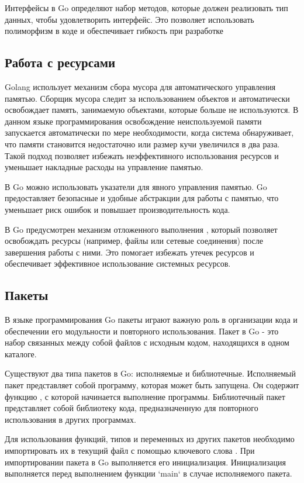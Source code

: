 Интерфейсы в Go определяют набор методов, которые должен реализовать тип данных, чтобы удовлетворить интерфейс.
Это позволяет использовать полиморфизм в коде и обеспечивает гибкость при разработке



\subsection*{Работа с ресурсами}

Golang использует механизм сбора мусора для автоматического управления памятью.
Сборщик мусора следит за использованием объектов и автоматически освобождает память, занимаемую объектами, которые больше не используются.
В данном языке программирования освобождение неиспользуемой памяти запускается автоматически по мере необходимости, когда система обнаруживает, что памяти становится недостаточно или размер кучи увеличился в два раза.
Такой подход позволяет избежать неэффективного использования ресурсов и уменьшает накладные расходы на управление памятью.

В Go можно использовать указатели для явного управления памятью.
Go предоставляет безопасные и удобные абстракции для работы с памятью, что уменьшает риск ошибок и повышает производительность кода.

В Go предусмотрен механизм отложенного выполнения , который позволяет освобождать ресурсы (например, файлы или сетевые соединения) после завершения работы с ними.
Это помогает избежать утечек ресурсов и обеспечивает эффективное использование системных ресурсов.

\subsection*{Пакеты}

В языке программирования Go пакеты играют важную роль в организации кода и обеспечении его модульности и повторного использования.
Пакет в Go - это набор связанных между собой файлов с исходным кодом, находящихся в одном каталоге.

Существуют два типа пакетов в Go: исполняемые и библиотечные.
Исполняемый пакет представляет собой программу, которая может быть запущена.
Он содержит функцию , с которой начинается выполнение программы.
Библиотечный пакет представляет собой библиотеку кода, предназначенную для повторного использования в других программах.

Для использования функций, типов и переменных из других пакетов необходимо импортировать их в текущий файл с помощью ключевого слова .
При импортировании пакета в Go выполняется его инициализация.
Инициализация выполняется перед выполнением функции `main` в случае исполняемого пакета.

